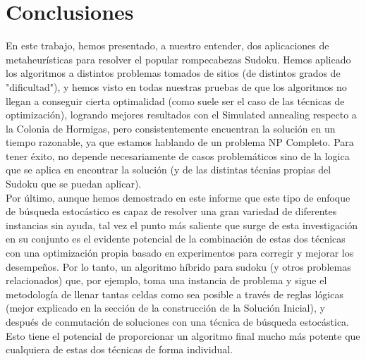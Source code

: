 \section{Conclusiones}

En este trabajo, hemos presentado, a nuestro entender, dos aplicaciones de metaheurísticas para resolver el  popular rompecabezas Sudoku. Hemos aplicado los algoritmos a distintos problemas tomados de sitios (de distintos grados de "dificultad"), y hemos visto en todas nuestras pruebas de que los algoritmos no llegan a conseguir cierta optimalidad (como suele ser el caso de las técnicas de optimización), logrando mejores resultados con el Simulated annealing respecto a la Colonia de Hormigas, pero consistentemente encuentran la solución en un tiempo razonable, ya que estamos hablando de un problema NP Completo. Para tener éxito, no depende necesariamente de casos problemáticos sino de la logica que se aplica en encontrar la solución (y de las distintas técnias propias del Sudoku que se puedan aplicar).\\
Por último, aunque hemos demostrado en este informe que este tipo de enfoque de búsqueda estocástico es capaz de resolver una gran variedad de diferentes instancias sin ayuda, tal vez el punto más saliente que surge de esta investigación en su conjunto es el evidente potencial de la combinación de estas dos técnicas con una optimización propia basado en experimentos para corregir y mejorar los desempeños.  Por lo tanto, un algoritmo híbrido para sudoku (y otros problemas relacionados) que, por ejemplo, toma una instancia de problema y sigue el metodología de  llenar tantas celdas como sea posible a través de reglas lógicas (mejor explicado en la sección de la construcción de la Solución Inicial), y después de conmutación de soluciones con una técnica de búsqueda estocástica. Esto tiene el potencial de proporcionar un algoritmo final mucho más potente que cualquiera de estas dos técnicas de forma individual. 

